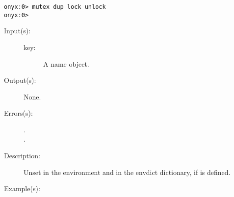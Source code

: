\begin{description}
\begin{description}
\begin{verbatim}
onyx:0> mutex dup lock unlock
onyx:0>
		\end{verbatim}
	\end{description}
\label{systemdict:unsetenv}
\item[{\onyxop{key}{unsetenv}{--}}: ]
	\begin{description}\item[]
	\item[Input(s): ]
		\begin{description}\item[]
		\item[key: ]
			A name object.
		\end{description}
	\item[Output(s): ] None.
	\item[Errors(s): ]
		\begin{description}\item[]
		\item[.]
		\item[.]
		\end{description}
	\item[Description: ]
		Unset  in the environment and in the envdict
		dictionary, if  is defined.
	\item[Example(s): ]\begin{verbatim}


\end{verbatim}
\end{description}
\end{description}
